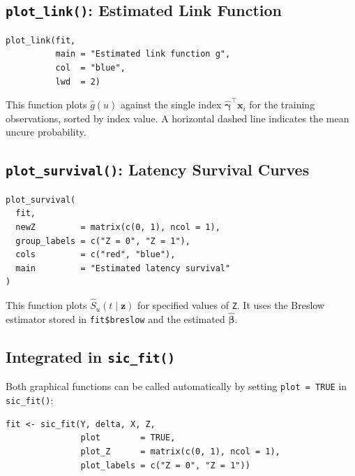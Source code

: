 \documentclass[12pt,a4paper]{article}
\begin{document}
\subsection{\texttt{plot\_link()}: Estimated Link Function}

\begin{lstlisting}[style=Rcode,
  caption={Plotting the estimated link function g}]
plot_link(fit,
          main = "Estimated link function g",
          col  = "blue",
          lwd  = 2)
\end{lstlisting}

This function plots $\hat{g}(u)$ against the single index
$\hat{\boldsymbol{\gamma}}^\top \mathbf{x}_i$ for the training
observations, sorted by index value. A horizontal dashed line
indicates the mean uncure probability.

\subsection{\texttt{plot\_survival()}: Latency Survival Curves}

\begin{lstlisting}[style=Rcode,
  caption={Plotting latency survival S\_u(t|z)}]
plot_survival(
  fit,
  newZ         = matrix(c(0, 1), ncol = 1),
  group_labels = c("Z = 0", "Z = 1"),
  cols         = c("red", "blue"),
  main         = "Estimated latency survival"
)
\end{lstlisting}

This function plots $\hat{S}_u(t \mid \mathbf{z})$ for specified
values of \texttt{Z}. It uses the Breslow estimator stored in
\texttt{fit\$breslow} and the estimated $\hat{\boldsymbol{\beta}}$.

\subsection{Integrated in \texttt{sic\_fit()}}

Both graphical functions can be called automatically by setting
\texttt{plot = TRUE} in \texttt{sic\_fit()}:

\begin{lstlisting}[style=Rcode,
  caption={Automatic plots within sic\_fit()}]
fit <- sic_fit(Y, delta, X, Z,
               plot        = TRUE,
               plot_Z      = matrix(c(0, 1), ncol = 1),
               plot_labels = c("Z = 0", "Z = 1"))
\end{lstlisting}

\end{document}
